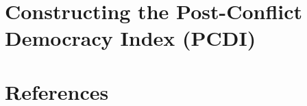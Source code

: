 \documentclass [11pt]{article}
\begin{document}
\section*{Constructing the Post-Conflict Democracy Index (PCDI)}








































\section*{References} 

\begin{hangparas}{1cm}{1}

\end{hangparas}
\end{document}

